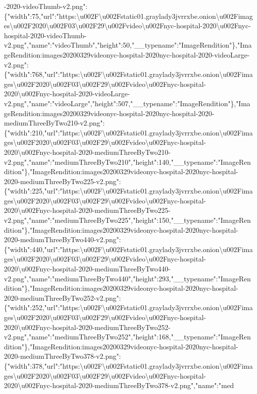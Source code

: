 -2020-videoThumb-v2.png":\{"width":75,"url":"https:\textbackslash{}u002F\textbackslash{}u002Fstatic01.graylady3jvrrxbe.onion\textbackslash{}u002Fimages\textbackslash{}u002F2020\textbackslash{}u002F03\textbackslash{}u002F29\textbackslash{}u002Fvideo\textbackslash{}u002Fnyc-hospital-2020\textbackslash{}u002Fnyc-hospital-2020-videoThumb-v2.png","name":"videoThumb","height":50,"\_\_typename":"ImageRendition"\},"ImageRendition:images20200329videonyc-hospital-2020nyc-hospital-2020-videoLarge-v2.png":\{"width":768,"url":"https:\textbackslash{}u002F\textbackslash{}u002Fstatic01.graylady3jvrrxbe.onion\textbackslash{}u002Fimages\textbackslash{}u002F2020\textbackslash{}u002F03\textbackslash{}u002F29\textbackslash{}u002Fvideo\textbackslash{}u002Fnyc-hospital-2020\textbackslash{}u002Fnyc-hospital-2020-videoLarge-v2.png","name":"videoLarge","height":507,"\_\_typename":"ImageRendition"\},"ImageRendition:images20200329videonyc-hospital-2020nyc-hospital-2020-mediumThreeByTwo210-v2.png":\{"width":210,"url":"https:\textbackslash{}u002F\textbackslash{}u002Fstatic01.graylady3jvrrxbe.onion\textbackslash{}u002Fimages\textbackslash{}u002F2020\textbackslash{}u002F03\textbackslash{}u002F29\textbackslash{}u002Fvideo\textbackslash{}u002Fnyc-hospital-2020\textbackslash{}u002Fnyc-hospital-2020-mediumThreeByTwo210-v2.png","name":"mediumThreeByTwo210","height":140,"\_\_typename":"ImageRendition"\},"ImageRendition:images20200329videonyc-hospital-2020nyc-hospital-2020-mediumThreeByTwo225-v2.png":\{"width":225,"url":"https:\textbackslash{}u002F\textbackslash{}u002Fstatic01.graylady3jvrrxbe.onion\textbackslash{}u002Fimages\textbackslash{}u002F2020\textbackslash{}u002F03\textbackslash{}u002F29\textbackslash{}u002Fvideo\textbackslash{}u002Fnyc-hospital-2020\textbackslash{}u002Fnyc-hospital-2020-mediumThreeByTwo225-v2.png","name":"mediumThreeByTwo225","height":150,"\_\_typename":"ImageRendition"\},"ImageRendition:images20200329videonyc-hospital-2020nyc-hospital-2020-mediumThreeByTwo440-v2.png":\{"width":440,"url":"https:\textbackslash{}u002F\textbackslash{}u002Fstatic01.graylady3jvrrxbe.onion\textbackslash{}u002Fimages\textbackslash{}u002F2020\textbackslash{}u002F03\textbackslash{}u002F29\textbackslash{}u002Fvideo\textbackslash{}u002Fnyc-hospital-2020\textbackslash{}u002Fnyc-hospital-2020-mediumThreeByTwo440-v2.png","name":"mediumThreeByTwo440","height":293,"\_\_typename":"ImageRendition"\},"ImageRendition:images20200329videonyc-hospital-2020nyc-hospital-2020-mediumThreeByTwo252-v2.png":\{"width":252,"url":"https:\textbackslash{}u002F\textbackslash{}u002Fstatic01.graylady3jvrrxbe.onion\textbackslash{}u002Fimages\textbackslash{}u002F2020\textbackslash{}u002F03\textbackslash{}u002F29\textbackslash{}u002Fvideo\textbackslash{}u002Fnyc-hospital-2020\textbackslash{}u002Fnyc-hospital-2020-mediumThreeByTwo252-v2.png","name":"mediumThreeByTwo252","height":168,"\_\_typename":"ImageRendition"\},"ImageRendition:images20200329videonyc-hospital-2020nyc-hospital-2020-mediumThreeByTwo378-v2.png":\{"width":378,"url":"https:\textbackslash{}u002F\textbackslash{}u002Fstatic01.graylady3jvrrxbe.onion\textbackslash{}u002Fimages\textbackslash{}u002F2020\textbackslash{}u002F03\textbackslash{}u002F29\textbackslash{}u002Fvideo\textbackslash{}u002Fnyc-hospital-2020\textbackslash{}u002Fnyc-hospital-2020-mediumThreeByTwo378-v2.png","name":"med
